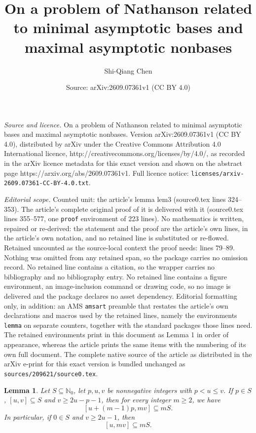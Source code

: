 \documentclass[10pt,a4paper]{amsart}
\title{\Large On a problem of Nathanson related to minimal asymptotic bases and maximal asymptotic nonbases}
\author{Shi-Qiang Chen}
\date{Source: arXiv:2609.07361v1 (CC BY 4.0)}
\newtheorem{lemma}{Lemma}
\newcommand{\Nzero}{\mathbb N_0}
\begin{document}
\maketitle

\noindent\emph{Source and licence.} \Large On a problem of Nathanson related to minimal asymptotic bases and maximal asymptotic nonbases. Version arXiv:2609.07361v1 (CC BY 4.0), distributed by arXiv under the Creative Commons Attribution 4.0 International licence, http://creativecommons.org/licenses/by/4.0/, as recorded in the arXiv licence metadata for this exact version and shown on the abstract page https://arxiv.org/abs/2609.07361v1. Full licence notice: \texttt{licenses/arxiv-2609.07361-CC-BY-4.0.txt}.\par\smallskip

\noindent\textit{Editorial scope.} Counted unit: the article's lemma lem3 (source0.tex lines 324--353). The article's complete original proof of it is delivered with it (source0.tex lines 355--577, one \texttt{proof} environment of 223 lines). No mathematics is written, repaired or re-derived: the statement and the proof are the article's own lines, in the article's own notation, and no retained line is substituted or re-flowed.  Retained uncounted as the source-local context the proof needs: lines 79--89.  Nothing was omitted from any retained span, so the package carries no omission record.  No retained line contains a citation, so the wrapper carries no bibliography and no bibliography entry.  No retained line contains a figure environment, an image-inclusion command or drawing code, so no image is delivered and the package declares no asset dependency.  Editorial formatting only, in addition: an AMS \texttt{amsart} preamble that restates the article's own declarations and macros used by the retained lines, namely the environments \texttt{lemma} on separate counters, together with the standard packages those lines need.  The retained environments print in this document as Lemma 1 in order of appearance, whereas the article prints the same items with the numbering of its own full document.  The complete native source of the article as distributed in the arXiv e-print for this exact version is bundled unchanged as \texttt{sources/209621/source0.tex}.
\begin{lemma}\label{lem1}
Let $S\subseteq\Nzero$, let $p,u,v$ be nonnegative integers with $p<u\le v$. If $p\in S$, $[u,v]\subseteq S$ and $v\ge 2u-p-1$,
then for every integer $m\ge2$, we have
\[
 [u+(m-1)p,mv]\subseteq mS.
\]
In particular, if $0\in S$ and $v\ge2u-1$, then
\[
 [u,mv]\subseteq mS.
\]
\end{lemma}
\end{document}
